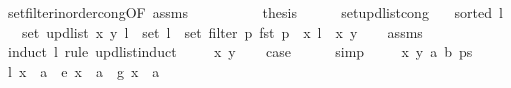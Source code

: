 \begin{isabellebody}
\ set{\isacharunderscore}{\kern0pt}filter{\isacharunderscore}{\kern0pt}inorder{\isacharunderscore}{\kern0pt}cong{\isacharbrackleft}{\kern0pt}OF\ assms{\isacharbrackright}{\kern0pt}\isanewline
\ \ \ \ \isacommand{{\isachardot}{\kern0pt}{\isachardot}{\kern0pt}}\isamarkupfalse%
\isanewline
\ \ \isamarkupfalse%
\ \isamarkupfalse%
\ {\isacharquery}{\kern0pt}thesis\isanewline
\ \ \ \ \isacommand{{\isachardot}{\kern0pt}}\isamarkupfalse%
\isanewline
{}\isamarkupfalse%
%
\endisatagproof
{\isafoldproof}%
%
\isadelimproof
\isanewline
%
\endisadelimproof
\isanewline
\isanewline
{}\isamarkupfalse%
\ set{\isacharunderscore}{\kern0pt}upd{\isacharunderscore}{\kern0pt}list{\isacharunderscore}{\kern0pt}cong{\isacharcolon}{\kern0pt}\isanewline
\ \ \ {\isachardoublequoteopen}sorted{}\ l{\isachardoublequoteclose}\isanewline
\ \ \ {\isachardoublequoteopen}set\ {\isacharparenleft}{\kern0pt}upd{\isacharunderscore}{\kern0pt}list\ x\ y\ l{\isacharparenright}{\kern0pt}\ {\isacharequal}{\kern0pt}\ set\ l\ {\isacharminus}{\kern0pt}\ set\ {\isacharparenleft}{\kern0pt}filter\ {\isacharparenleft}{\kern0pt}{\isasymlambda}p{\isachardot}{\kern0pt}\ fst\ p\ {\isacharequal}{\kern0pt}\ x{\isacharparenright}{\kern0pt}\ l{\isacharparenright}{\kern0pt}\ {\isasymunion}\ {\isacharbraceleft}{\kern0pt}{\isacharparenleft}{\kern0pt}x{\isacharcomma}{\kern0pt}\ y{\isacharparenright}{\kern0pt}{\isacharbraceright}{\kern0pt}{\isachardoublequoteclose}\isanewline
%
\isadelimproof
\ \ %
\endisadelimproof
%
\isatagproof
{}\isamarkupfalse%
\ assms\isanewline
{}\isamarkupfalse%
\ {\isacharparenleft}{\kern0pt}induct\ l\ rule{\isacharcolon}{\kern0pt}\ upd{\isacharunderscore}{\kern0pt}list{\isachardot}{\kern0pt}induct{\isacharparenright}{\kern0pt}\isanewline
\ \ \isamarkupfalse%
\ {\isacharparenleft}{\kern0pt}{}\ x\ y{\isacharparenright}{\kern0pt}\isanewline
\ \ \isamarkupfalse%
\ {\isacharquery}{\kern0pt}case\isanewline
\ \ \ \ \isamarkupfalse%
\ simp\isanewline
{}\isamarkupfalse%
\isanewline
\ \ \isamarkupfalse%
\ {\isacharparenleft}{\kern0pt}{}\ x\ y\ a\ b\ ps{\isacharparenright}{\kern0pt}\isanewline
\ \ \isamarkupfalse%
\ {\isacharparenleft}{\kern0pt}l{\isacharparenright}{\kern0pt}\ {\isachardoublequoteopen}x\ {\isacharless}{\kern0pt}\ a{\isachardoublequoteclose}\ {\isacharbar}{\kern0pt}\ {\isacharparenleft}{\kern0pt}e{\isacharparenright}{\kern0pt}\ {\isachardoublequoteopen}x\ {\isacharequal}{\kern0pt}\ a{\isachardoublequoteclose}\ {\isacharbar}{\kern0pt}\ {\isacharparenleft}{\kern0pt}g{\isacharparenright}{\kern0pt}\ {\isachardoublequoteopen}x\ {\isachargreater}{\kern0pt}\ a{\isachardoublequoteclose}\isanewline

\end{isabellebody}
